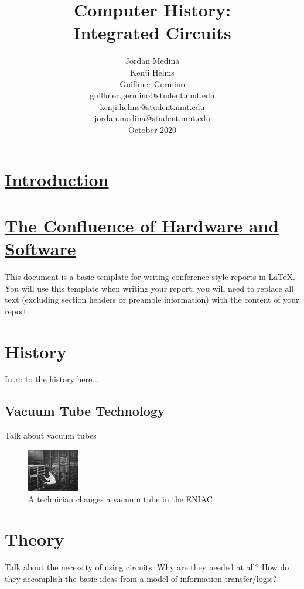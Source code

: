 \documentclass[letterpaper, 10 pt, conference]{IEEEconf}
\title{\LARGE \bf
Computer History:\\Integrated Circuits
}
\author{Jordan Medina\\Kenji Helms\\Guillmer Germino\\
\small guillmer.germino@student.nmt.edu\\
\small kenji.helms@student.nmt.edu\\
\small jordan.medina@student.nmt.edu\\
\small {October 2020}
}
\begin{document}
\maketitle




\section{\underline{Introduction}\\\\
\small {\underline{The Confluence of Hardware and Software}}}

This document is a basic template for writing conference-style                  
reports in LaTeX. You will use this template when writing                       
your report; you will need to replace all text (excluding                       
section headers or preamble information) with the content                       
of your report.

\section{History}
Intro to the history here...

\subsection{Vacuum Tube Technology}
Talk about vacuum tubes

\begin{figure}[h!]
\centering
\captionsetup{justification=centering}
\includegraphics[width=0.2\textwidth]{ENIAC-changing_a_tube.jpg}
\caption{A technician changes a vacuum tube in the ENIAC}
\label{fig:example}
\end{figure} 




\section{Theory}

Talk about the necessity of using circuits. Why are they needed at all? How do they accomplish the basic ideas from a model of information transfer/logic?
\end{document}
